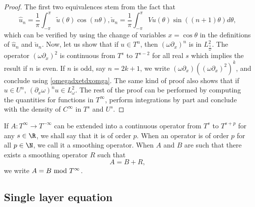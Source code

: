 \documentclass[a4paper]{article}
\begin{document}
	\begin{proof}
		The first two equivalences stem from the fact that 
		\[\hat{u}_n = \frac{1}{\pi}\int_{-\pi}^{\pi} \tilde{u}(\theta) \cos(n \theta), \check{u}_n = \frac{1}{\pi} \int_{-\pi}^{\pi} Vu(\theta) \sin((n+1)\theta)d\theta,\]
		which can be verified by using the change of variables $x = \cos\theta$ in the definitions of $\hat{u}_n$ and $\check{u}_n$. 
		Now, let us show that if $ u \in T^n$, then $(\omega \partial_x)^n$ is in $L^2_\frac{1}{\omega}$. The operator $(\omega \partial_x)^2$ is continuous from $T^s$ to $T^{s-2}$ for all real $s$ which implies the result if $n$ is even. If $n$ is odd, say $n = 2k + 1$, we write $(\omega \partial_x)((\omega \partial_x)^{2})^k$, and conclude using \autoref{omegadxetdxomga}.
		The same kind of proof also shows that if $u \in U^n$, $(\partial_x \omega )^nu \in L^2_\omega$.
		The rest of the proof can be performed by computing the quantities for functions in $T^{\infty}$, perform integrations by part and conclude with the density of $C^{\infty}$ in $T^s$ and $U^s$. 
	\end{proof}
	\begin{Def}
		If $A : T^{\infty} \to T^{-\infty}$ can be extended into a continuous operator from $T^{s}$ to $T^{s + p}$ for any $s \in \R$, we shall say that it is of order $p$. When an operator is of order $p$ for all $p \in \N$, we call it a smoothing operator. When $A$ and $B$ are such that there exists a smoothing operator $R$ such that 
		\[A = B + R,\]
		we write $A = B \textup{  mod  }  T^{\infty}$.
	\end{Def}
	
	
	
	
	

	
	\subsection{Single layer equation}
	
\end{document}
